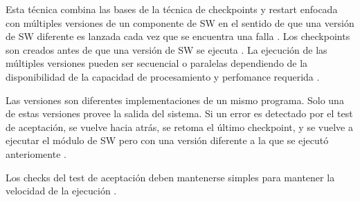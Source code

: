 Esta técnica combina las bases de la técnica de checkpoints y restart enfocada con múltiples 
versiones de un componente de \ac{SW} en el sentido de que una versión de \ac{SW} diferente es 
lanzada cada vez que se encuentra una falla \citep{SoftwareFaultToleranceATutorial}. Los 
checkpoints son creados antes de que una versión de \ac{SW} se ejecuta 
\citep{SoftwareFaultToleranceATutorial}. La ejecución de las múltiples versiones pueden ser 
secuencial o paralelas dependiendo de la disponibilidad de la capacidad de procesamiento y 
perfomance requerida \citep{SoftwareFaultToleranceATutorial}.

Las 
versiones son diferentes implementaciones de un mismo programa. Solo una de estas versiones provee 
la salida del sistema. Si un error es detectado por el test de aceptación, se vuelve hacia atrás, 
se retoma el último checkpoint, y se vuelve a ejecutar el módulo de \ac{SW} pero con una 
versión diferente a la que se ejecutó anteriomente \citep{FTDesign}.  	

Los checks del test de aceptación deben mantenerse simples para mantener la velocidad de la 
ejecución \citep{FTDesign}.

